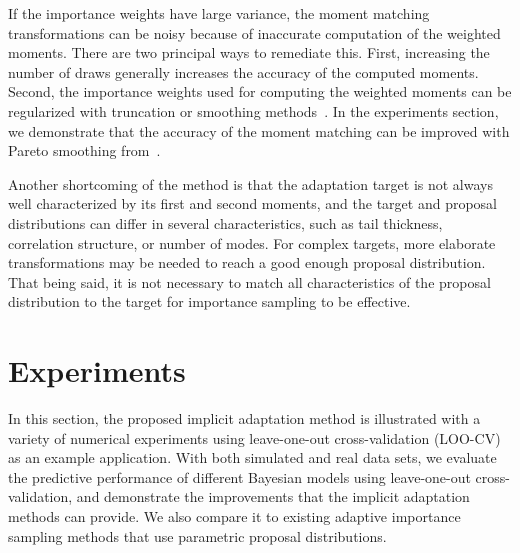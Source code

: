 \documentclass[12pt]{article}
\begin{document}
If the importance weights have large variance, the moment matching transformations can be noisy
because of inaccurate computation of the weighted moments.
There are two principal ways to remediate this.
First, increasing the number of draws generally increases the accuracy
of the computed moments.
Second, the importance weights used for computing the weighted moments
can be regularized with truncation or smoothing methods~\citep{ionides2008truncated,koblents2015population,miguez2018analysis,vehtari2015pareto,bugallo2017adaptive}.
In the experiments section, we demonstrate that
the accuracy of the moment matching can be improved with Pareto smoothing from~\citet{vehtari2015pareto}.
%
%



Another shortcoming of the method is that the adaptation target is not always well characterized by its first and second moments, and
the target and proposal distributions can differ in several
characteristics, such as tail thickness, correlation structure, or
number of modes.
For complex targets, more
elaborate transformations may be needed
to reach a good enough proposal distribution.
That being said, it is not necessary to match all characteristics of the
proposal distribution to the target for importance sampling to be effective.














\section{Experiments} \label{sec:experiments}






In this section,
the proposed implicit adaptation method is illustrated with a variety of
numerical experiments using leave-one-out cross-validation (LOO-CV) as an example application.
With both simulated and real data sets, we evaluate
the predictive performance of different Bayesian models using
%
leave-one-out cross-validation, and demonstrate
the improvements that the implicit adaptation methods can provide.
We also compare it to existing adaptive importance sampling methods
that use parametric proposal distributions.
\end{document}
